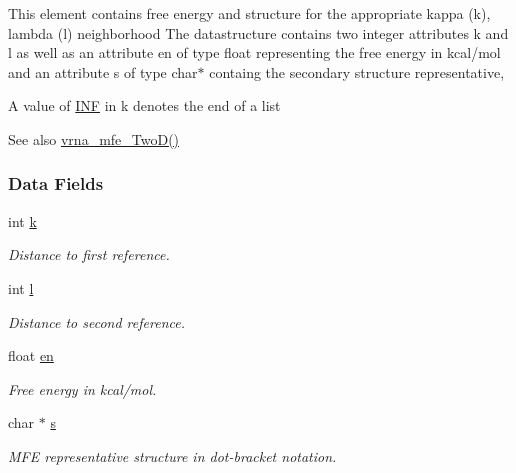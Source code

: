 This element contains free energy and structure for the appropriate kappa (k), lambda (l) neighborhood The datastructure contains two integer attributes \textquotesingle{}k\textquotesingle{} and \textquotesingle{}l\textquotesingle{} as well as an attribute \textquotesingle{}en\textquotesingle{} of type float representing the free energy in kcal/mol and an attribute \textquotesingle{}s\textquotesingle{} of type char$\ast$ containg the secondary structure representative,

A value of \mbox{\hyperlink{constants_8h_a12c2040f25d8e3a7b9e1c2024c618cb6}{I\+NF}} in k denotes the end of a list

\begin{DoxySeeAlso}{See also}
\mbox{\hyperlink{group__kl__neighborhood__mfe_ga243c288b463147352829df04de6a2f77}{vrna\+\_\+mfe\+\_\+\+Two\+D()}} 
\end{DoxySeeAlso}
\subsubsection*{Data Fields}
\begin{DoxyCompactItemize}
\item 
\mbox{\label{group__kl__neighborhood__mfe_ac111e850bb3b3a11b6b5707912cfa1b8}} 
int \mbox{\hyperlink{group__kl__neighborhood__mfe_ac111e850bb3b3a11b6b5707912cfa1b8}{k}}
\begin{DoxyCompactList}\small\item\em Distance to first reference. \end{DoxyCompactList}\item 
\mbox{\label{group__kl__neighborhood__mfe_ab8e95cd920901175a2cc8de726ab1d36}} 
int \mbox{\hyperlink{group__kl__neighborhood__mfe_ab8e95cd920901175a2cc8de726ab1d36}{l}}
\begin{DoxyCompactList}\small\item\em Distance to second reference. \end{DoxyCompactList}\item 
\mbox{\label{group__kl__neighborhood__mfe_a7577863a6a84224dfee39b321c03cab1}} 
float \mbox{\hyperlink{group__kl__neighborhood__mfe_a7577863a6a84224dfee39b321c03cab1}{en}}
\begin{DoxyCompactList}\small\item\em Free energy in kcal/mol. \end{DoxyCompactList}\item 
\mbox{\label{group__kl__neighborhood__mfe_ac5942d2505a6cd7e4a8073a321d5d2d5}} 
char $\ast$ \mbox{\hyperlink{group__kl__neighborhood__mfe_ac5942d2505a6cd7e4a8073a321d5d2d5}{s}}
\begin{DoxyCompactList}\small\item\em M\+FE representative structure in dot-\/bracket notation. \end{DoxyCompactList}\end{DoxyCompactItemize}
\label{structTwoDfold__vars}

